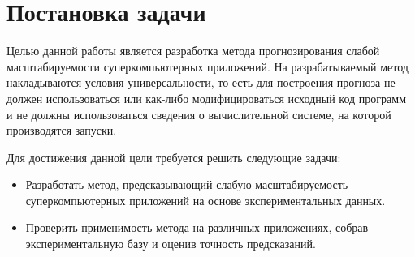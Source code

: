 \section{Постановка задачи}
	Целью данной работы является разработка метода прогнозирования слабой масштабируемости суперкомпьютерных приложений. На разрабатываемый метод накладываются условия универсальности, то есть для построения прогноза не должен использоваться или как-либо модифицироваться исходный код программ и не должны использоваться сведения о вычислительной системе, на которой производятся запуски.

	Для достижения данной цели требуется решить следующие задачи:
	\begin{itemize}
		\item Разработать метод, предсказывающий слабую масштабируемость суперкомпьютерных приложений на основе экспериментальных данных.
		\item Проверить применимость метода на различных приложениях, собрав экспериментальную базу и оценив точность предсказаний.
	\end{itemize}


\clearpage
